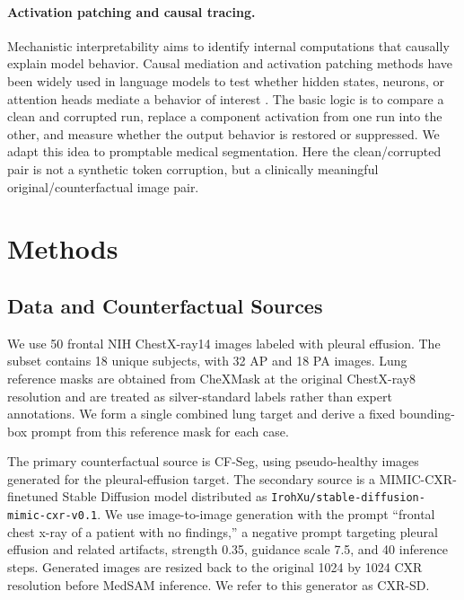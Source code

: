 \documentclass[runningheads]{llncs}
\begin{document}
\paragraph{Activation patching and causal tracing.}
Mechanistic interpretability aims to identify internal computations that causally explain model behavior. Causal mediation and activation patching methods have been widely used in language models to test whether hidden states, neurons, or attention heads mediate a behavior of interest \cite{imai2010causal,vig2020causal,meng2022rome,zhang2023activationpatching}. The basic logic is to compare a clean and corrupted run, replace a component activation from one run into the other, and measure whether the output behavior is restored or suppressed. We adapt this idea to promptable medical segmentation. Here the clean/corrupted pair is not a synthetic token corruption, but a clinically meaningful original/counterfactual image pair.

\section{Methods}

\subsection{Data and Counterfactual Sources}

We use 50 frontal NIH ChestX-ray14 images labeled with pleural effusion. The subset contains 18 unique subjects, with 32 AP and 18 PA images. Lung reference masks are obtained from CheXMask at the original ChestX-ray8 resolution and are treated as silver-standard labels rather than expert annotations. We form a single combined lung target and derive a fixed bounding-box prompt from this reference mask for each case.

The primary counterfactual source is CF-Seg, using pseudo-healthy images generated for the pleural-effusion target. The secondary source is a MIMIC-CXR-finetuned Stable Diffusion model distributed as \texttt{IrohXu/stable-diffusion-mimic-cxr-v0.1}. We use image-to-image generation with the prompt ``frontal chest x-ray of a patient with no findings,'' a negative prompt targeting pleural effusion and related artifacts, strength 0.35, guidance scale 7.5, and 40 inference steps. Generated images are resized back to the original 1024 by 1024 CXR resolution before MedSAM inference. We refer to this generator as CXR-SD.
\end{document}
